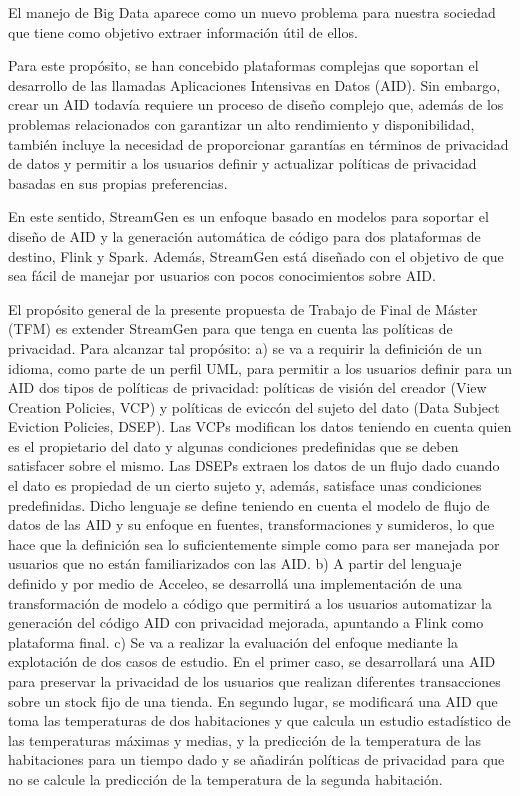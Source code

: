 \documentclass[12pt,twoside]{book}
\begin{document}
El manejo de Big Data aparece como un nuevo problema para nuestra sociedad que tiene como objetivo extraer información útil de ellos. 

Para este propósito, se han concebido plataformas complejas que soportan el desarrollo de las llamadas Aplicaciones Intensivas en Datos (AID). Sin embargo, crear un AID todavía requiere un proceso de diseño complejo que, además de los problemas relacionados con garantizar un alto rendimiento y disponibilidad, también incluye la necesidad de proporcionar garantías en términos de privacidad de datos y permitir a los usuarios definir y actualizar políticas de privacidad basadas en sus propias preferencias.

En este sentido, StreamGen es un enfoque basado en modelos para soportar el diseño de AID y la generación automática de código para dos plataformas de destino, Flink y Spark. Además, StreamGen está diseñado con el objetivo de que sea fácil de manejar por usuarios con pocos conocimientos sobre AID.

El propósito general de la presente propuesta de Trabajo de Final de Máster (TFM) es extender StreamGen para que tenga en cuenta las políticas de privacidad. Para alcanzar tal propósito:
a)  se va a requirir la definición de un idioma, como parte de un perfil UML, para permitir a los usuarios definir para un AID dos tipos de políticas de privacidad: políticas de visión del creador (View Creation Policies, VCP) y políticas de eviccón del sujeto del dato (Data Subject Eviction Policies, DSEP). Las VCPs modifican los datos teniendo en cuenta quien es el propietario del dato y algunas condiciones predefinidas que se deben satisfacer sobre el mismo. Las DSEPs extraen los datos de un flujo dado cuando el dato es propiedad de un cierto sujeto y, además, satisface unas condiciones predefinidas. Dicho lenguaje se define teniendo en cuenta el modelo de flujo de datos de las AID y su enfoque en fuentes, transformaciones y sumideros, lo que hace que la definición sea lo suficientemente simple como para ser manejada por usuarios que no están familiarizados con las AID.
b) A partir del lenguaje definido y por medio de Acceleo, se desarrollá una implementación de una transformación de modelo a código que permitirá a los usuarios automatizar la generación del código AID con privacidad mejorada, apuntando a Flink como plataforma final.
c) Se va a realizar la evaluación del enfoque mediante la explotación de dos casos de estudio. En el primer caso, se desarrollará una AID para preservar la privacidad de los usuarios que realizan diferentes transacciones sobre un stock fijo de una tienda.  En segundo lugar, se modificará una AID que toma las temperaturas de dos habitaciones y que calcula un estudio estadístico de las temperaturas máximas y medias, y la predicción de la temperatura de las habitaciones para un tiempo dado y se añadirán políticas de privacidad para que no se calcule la predicción de la temperatura de la segunda habitación.
\end{document}
